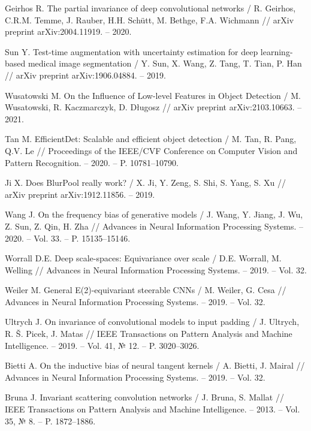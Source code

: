 \begin{thebibliography}{99}
Geirhos R. The partial invariance of deep convolutional networks / R. Geirhos, C.R.M. Temme, J. Rauber, H.H. Schütt, M. Bethge, F.A. Wichmann // arXiv preprint arXiv:2004.11919. -- 2020.

Sun Y. Test-time augmentation with uncertainty estimation for deep learning-based medical image segmentation / Y. Sun, X. Wang, Z. Tang, T. Tian, P. Han // arXiv preprint arXiv:1906.04884. -- 2019.

Wusatowski M. On the Influence of Low-level Features in Object Detection / M. Wusatowski, R. Kaczmarczyk, D. Długosz // arXiv preprint arXiv:2103.10663. -- 2021.

Tan M. EfficientDet: Scalable and efficient object detection / M. Tan, R. Pang, Q.V. Le // Proceedings of the IEEE/CVF Conference on Computer Vision and Pattern Recognition. -- 2020. -- P. 10781--10790.

Ji X. Does BlurPool really work? / X. Ji, Y. Zeng, S. Shi, S. Yang, S. Xu // arXiv preprint arXiv:1912.11856. -- 2019.

Wang J. On the frequency bias of generative models / J. Wang, Y. Jiang, J. Wu, Z. Sun, Z. Qin, H. Zha // Advances in Neural Information Processing Systems. -- 2020. -- Vol. 33. -- P. 15135--15146.

Worrall D.E. Deep scale-spaces: Equivariance over scale / D.E. Worrall, M. Welling // Advances in Neural Information Processing Systems. -- 2019. -- Vol. 32.

Weiler M. General E(2)-equivariant steerable CNNs / M. Weiler, G. Cesa // Advances in Neural Information Processing Systems. -- 2019. -- Vol. 32.

Ultrych J. On invariance of convolutional models to input padding / J. Ultrych, R. Š. Picek, J. Matas // IEEE Transactions on Pattern Analysis and Machine Intelligence. -- 2019. -- Vol. 41, № 12. -- P. 3020--3026.

Bietti A. On the inductive bias of neural tangent kernels / A. Bietti, J. Mairal // Advances in Neural Information Processing Systems. -- 2019. -- Vol. 32.

Bruna J. Invariant scattering convolution networks / J. Bruna, S. Mallat // IEEE Transactions on Pattern Analysis and Machine Intelligence. -- 2013. -- Vol. 35, № 8. -- P. 1872--1886.

\end{thebibliography} 